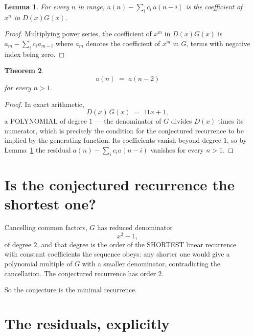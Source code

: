 \documentclass[11pt,a4paper]{article}
\theoremstyle{plain}
\newtheorem{theorem}{Theorem}
\newtheorem{lemma}[theorem]{Lemma}
\theoremstyle{definition}
\begin{document}
\begin{lemma}\label{lem:key}
For every $n$ in range, $a(n)-\sum_i c_i\,a(n-i)$ is the coefficient of $x^{n}$ in
$D(x)G(x)$.
\end{lemma}

\begin{proof}
Multiplying power series, the coefficient of $x^{m}$ in $D(x)G(x)$ is
$a_m-\sum_i c_i a_{m-i}$ where $a_m$ denotes the coefficient of $x^{m}$ in $G$, terms with
negative index being zero.
\end{proof}

\begin{theorem}
\[
a(n)\;=\;a(n-2)
\]
for every $n>1$.
\end{theorem}

\begin{proof}
In exact arithmetic,
\[
D(x)\,G(x)\;=\;11 x + 1,
\]
a POLYNOMIAL of degree $1$ --- the denominator of $G$ divides $D(x)$ times its numerator,
which is precisely the condition for the conjectured recurrence to be implied by the
generating function. Its coefficients vanish beyond degree $1$, so by
Lemma~\ref{lem:key} the residual $a(n)-\sum_ic_ia(n-i)$ vanishes for every
$n>1$.
\end{proof}

\section{Is the conjectured recurrence the shortest one?}

Cancelling common factors, $G$ has reduced denominator
\[
x^{2} - 1,
\]
of degree $2$, and that degree is the order of the SHORTEST linear recurrence with
constant coefficients the sequence obeys: any shorter one would give a polynomial multiple of
$G$ with a smaller denominator, contradicting the cancellation. The conjectured recurrence has
order $2$.

So the conjecture is the minimal recurrence.

\section{The residuals, explicitly}
\end{document}
